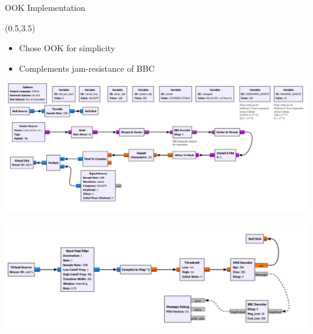 \documentclass[xcolor=x11names,compress,handout]{beamer}
\begin{document}

\begin{frame}{OOK Implementation}
	
	\begin{textblock}{14.5}(0.5,3.5)
		\begin{itemize}
			\item Chose OOK for simplicity
			\item Complements jam-resistance of BBC
		\end{itemize}
		\includegraphics[scale=0.45]{./figures/bbc_ook_1}
		
		\includegraphics[scale=0.45]{./figures/bbc_ook_2}
	\end{textblock}
\end{frame}

\end{document}
